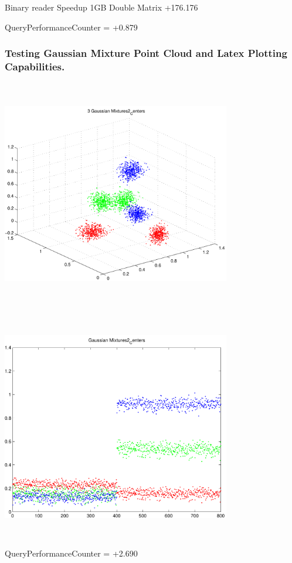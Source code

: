 \documentclass[9pt]{article}
\theoremstyle{plain}
\theoremstyle{definition}
\theoremstyle{remark}
\numberwithin{equation}{section}
\begin{document}
Binary reader Speedup 1GB Double Matrix +176.176

QueryPerformanceCounter  =  +0.879
\subsubsection{Testing Gaussian Mixture Point Cloud and Latex Plotting Capabilities.}
\includegraphics[width=10.0cm,height=10.0cm]{GaussianMixture_Dim_3_Centers2.pdf}

\includegraphics[width=10.0cm,height=10.0cm]{GaussianMixture_Dim_1_Centers2.pdf}

QueryPerformanceCounter  =  +2.690
\end{document}
